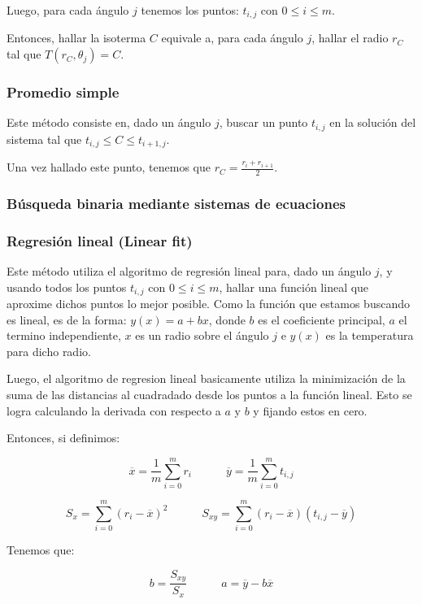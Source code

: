 Luego, para cada ángulo $j$ tenemos los puntos: $t_{i,j}$ con $0 \leq i \leq m$.

Entonces, hallar la isoterma $C$ equivale a, para cada ángulo $j$, hallar el radio $r_C$ tal que $T(r_C, \theta_j) = C$.

\subsubsection{Promedio simple}

Este método consiste en, dado un ángulo $j$, buscar un punto $t_{i,j}$ en la solución del sistema tal que $t_{i,j} \leq C \leq t_{i+1,j}$.

Una vez hallado este punto, tenemos que $r_C = \frac{r_i + r_{i+1}}{2}$.

\subsubsection{Búsqueda binaria mediante sistemas de ecuaciones}

\subsubsection{Regresión lineal (Linear fit)}

Este método utiliza el algoritmo de regresión lineal para, dado un ángulo $j$, y usando todos los puntos $t_{i,j}$ con $0 \leq i \leq m$, hallar una función lineal que aproxime dichos puntos lo mejor posible.
Como la función que estamos buscando es lineal, es de la forma: $y(x) = a + bx$, donde $b$ es el coeficiente principal, $a$ el termino independiente, $x$ es un radio sobre el ángulo $j$ e $y(x)$ es la temperatura para dicho radio.

Luego, el algoritmo de regresion lineal basicamente utiliza la minimización de la suma de las distancias al cuadradado desde los puntos a la función lineal. Esto se logra calculando la derivada con respecto a $a$ y $b$ y fijando estos en cero.

Entonces, si definimos:

$$\overline{x} = \frac{1}{m}\sum_{i=0}^{m}{r_i} \quad\quad\quad \overline{y} = \frac{1}{m}\sum_{i=0}^{m}{t_{i,j}}$$

$$S_x = \sum_{i=0}^{m}{(r_i - \overline{x})^2} \quad\quad\quad S_{xy} = \sum_{i=0}^{m}{(r_i - \overline{x})(t_{i,j} - \overline{y})}$$

Tenemos que:

$$b = \frac{S_{xy}}{S_x}  \quad\quad\quad a = \overline{y} - b\overline{x}$$

